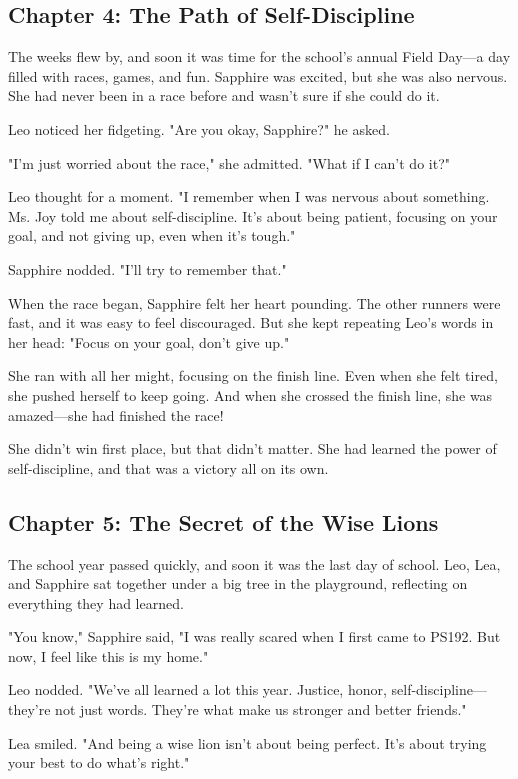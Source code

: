 \documentclass[11pt]{article}
\begin{document}
\subsection{Chapter 4: The Path of Self-Discipline}
\label{sec:orga966785}
The weeks flew by, and soon it was time for the school’s annual Field Day—a day filled with races, games, and fun. Sapphire was excited, but she was also nervous. She had never been in a race before and wasn’t sure if she could do it.

Leo noticed her fidgeting. "Are you okay, Sapphire?" he asked.

"I’m just worried about the race," she admitted. "What if I can’t do it?"

Leo thought for a moment. "I remember when I was nervous about something. Ms. Joy told me about self-discipline. It’s about being patient, focusing on your goal, and not giving up, even when it’s tough."

Sapphire nodded. "I’ll try to remember that."

When the race began, Sapphire felt her heart pounding. The other runners were fast, and it was easy to feel discouraged. But she kept repeating Leo’s words in her head: "Focus on your goal, don’t give up."

She ran with all her might, focusing on the finish line. Even when she felt tired, she pushed herself to keep going. And when she crossed the finish line, she was amazed—she had finished the race!

She didn’t win first place, but that didn’t matter. She had learned the power of self-discipline, and that was a victory all on its own.

\subsection{Chapter 5: The Secret of the Wise Lions}
\label{sec:org0ffe3dd}
The school year passed quickly, and soon it was the last day of school. Leo, Lea, and Sapphire sat together under a big tree in the playground, reflecting on everything they had learned.

"You know," Sapphire said, "I was really scared when I first came to PS192. But now, I feel like this is my home."

Leo nodded. "We’ve all learned a lot this year. Justice, honor, self-discipline—they’re not just words. They’re what make us stronger and better friends."

Lea smiled. "And being a wise lion isn’t about being perfect. It’s about trying your best to do what’s right."
\end{document}
